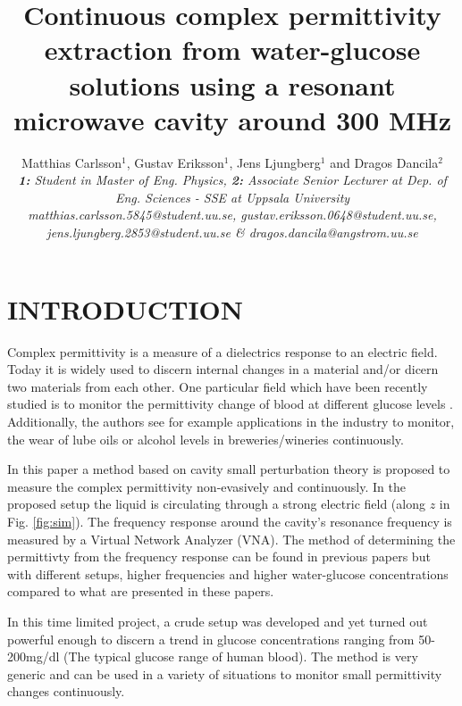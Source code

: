 \documentclass[10pt,final,conference,a4paper,twocolumn]{IEEEtran_AntennEMB_GigaHertz2016}
\begin{document}
\title{Continuous complex permittivity extraction from water-glucose solutions using a resonant microwave cavity around 300 MHz}

\author{Matthias Carlsson$^1$, Gustav Eriksson$^1$, Jens Ljungberg$^1$ and Dragos Dancila$^2$ \\
\em \small \textbf{1:} Student in Master of Eng. Physics, \textbf{2:} Associate Senior Lecturer at Dep. of Eng. Sciences - SSE at Uppsala University \\
\em \small matthias.carlsson.5845@student.uu.se, gustav.eriksson.0648@student.uu.se, \\
\em \small jens.ljungberg.2853@student.uu.se \& dragos.dancila@angstrom.uu.se
}

\maketitle
\section{INTRODUCTION}
 Complex permittivity is a measure of a dielectrics response to an electric field. Today it is widely used to discern internal changes in a material and/or dicern two materials from each other. One particular field which have been recently studied is to monitor the permittivity change of blood at different glucose levels \cite{c2}. Additionally,  the authors see for example applications in the industry to monitor, the wear of lube oils or alcohol levels in breweries/wineries continuously.
 
 In this paper a method based on cavity small perturbation theory \cite{c3} is proposed to measure the complex permittivity non-evasively and continuously. In the proposed setup the liquid is circulating through a strong electric field (along $z$ in Fig. \ref{fig:sim}). The frequency response around the cavity's resonance frequency is measured by a Virtual Network Analyzer (VNA). The method of determining the permittivty from the frequency response can be found in previous papers \cite{c2}\cite{c1} but with different setups, higher frequencies and higher water-glucose concentrations compared to what are presented in these papers.
 
 In this time limited project, a crude setup was developed and yet turned out powerful enough to discern a trend in glucose concentrations ranging from 50-200mg/dl (The typical glucose range of human blood). The method is very generic and can be used in a variety of situations to monitor small permittivity changes continuously.
 
\end{document}
